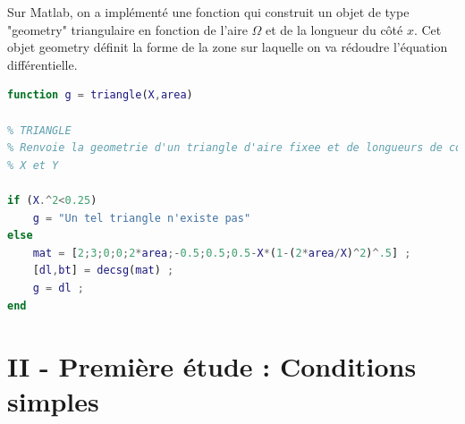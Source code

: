 \documentclass[a4paper,reqno]{article}
\begin{document}
Sur Matlab, on a implémenté une fonction qui construit un objet de type "geometry" triangulaire en fonction de l'aire $\Omega$ et de la longueur du côté $x$. Cet objet geometry définit la forme de la zone sur laquelle on va rédoudre l'équation différentielle. 

\newpage

\begin{lstlisting}[language=Matlab,frame=single,caption=Construction d'une géométrie Triangulaire]
function g = triangle(X,area)

% TRIANGLE
% Renvoie la geometrie d'un triangle d'aire fixee et de longueurs de cote 
% X et Y 

if (X.^2<0.25)
    g = "Un tel triangle n'existe pas" 
else 
    mat = [2;3;0;0;2*area;-0.5;0.5;0.5-X*(1-(2*area/X)^2)^.5] ; 
    [dl,bt] = decsg(mat) ;
    g = dl ;
end
\end{lstlisting}

\section*{II - Première étude : Conditions simples}
\end{document}
